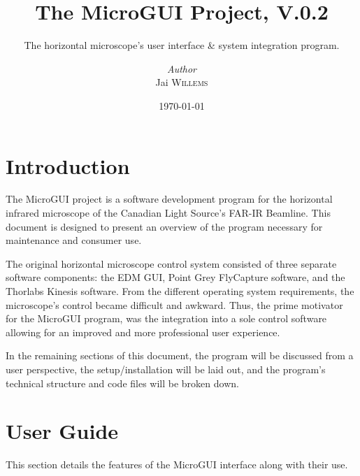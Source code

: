 \documentclass[a4paper, 12pt]{report}
\institute{Canadian Light Source}
\title{The MicroGUI Project, V.0.2}
\subtitle{The horizontal microscope's user interface \& system integration program.}
\author{\textit{Author}\\Jai \textsc{Willems}}
\date{\today}
\begin{document}
    \maketitle
    \romantableofcontents
    
    


    \chapter{Introduction}
    
    The MicroGUI project is a software development program for the horizontal infrared microscope of the Canadian Light Source's FAR-IR Beamline. This document is designed to present an overview of the program necessary for maintenance and consumer use.
    
    The original horizontal microscope control system consisted of three separate software components: the EDM GUI, Point Grey FlyCapture software, and the Thorlabs Kinesis software. From the different operating system requirements, the microscope's control became difficult and awkward. Thus, the prime motivator for the MicroGUI program, was the integration into a sole control software allowing for an improved and more professional user experience.
    
    In the remaining sections of this document, the program will be discussed from a user perspective, the setup/installation will be laid out, and the program's technical structure and code files will be broken down.
    
    
    
    
    \chapter{User Guide}
    This section details the features of the MicroGUI interface along with their use.
    
\end{document}
